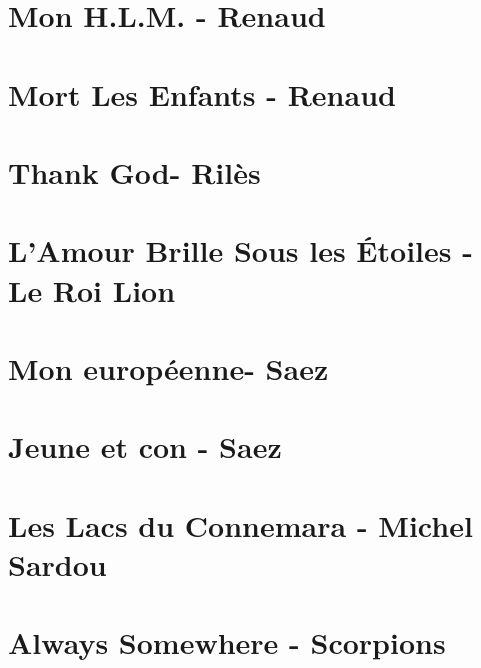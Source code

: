 \documentclass[11pt]{article}
\begin{document}
\section*{Mon H.L.M. - Renaud}
\begin{guitar}

\end{guitar}

\section{Mort Les Enfants - Renaud}
\begin{guitar}

\end{guitar}

\section{Thank God- Rilès}
\begin{guitar}

\end{guitar}

\section{L'Amour Brille Sous les Étoiles - Le Roi Lion}


\section{Mon européenne- Saez}
\begin{guitar}

\end{guitar}


\section{Jeune et con - Saez}
\begin{guitar}

\end{guitar}

\section{Les Lacs du Connemara - Michel Sardou}
\begin{guitar}

\end{guitar}

\section*{Always Somewhere - Scorpions}
\begin{guitar}

\end{guitar}
\end{document}
